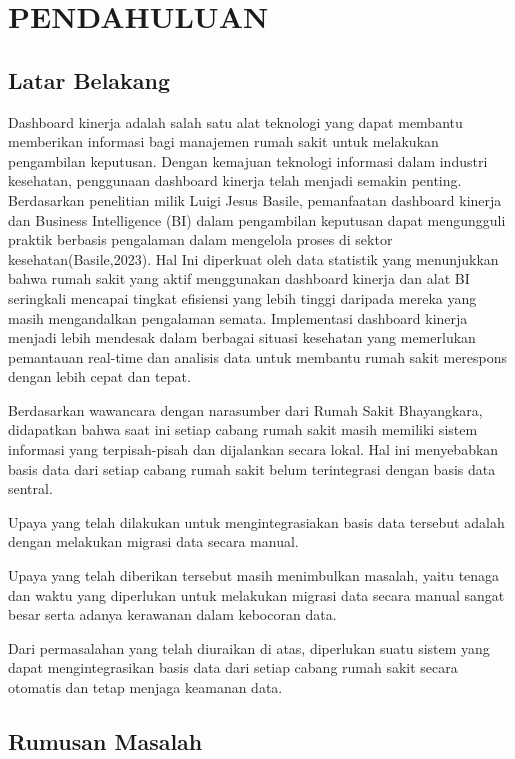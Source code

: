 \chapter{PENDAHULUAN}

\section{Latar Belakang}

Dashboard kinerja adalah salah satu alat teknologi yang dapat membantu memberikan informasi bagi manajemen rumah sakit untuk
melakukan pengambilan keputusan. Dengan kemajuan teknologi informasi dalam industri kesehatan, penggunaan dashboard kinerja telah menjadi semakin penting.
Berdasarkan penelitian milik Luigi Jesus Basile, pemanfaatan dashboard kinerja dan Business Intelligence (BI) dalam pengambilan keputusan dapat mengungguli praktik berbasis pengalaman 
dalam mengelola proses di sektor kesehatan(Basile,2023). Hal Ini diperkuat oleh data statistik yang menunjukkan bahwa rumah sakit yang aktif 
menggunakan dashboard kinerja dan alat BI seringkali mencapai tingkat efisiensi yang lebih tinggi daripada mereka yang masih 
mengandalkan pengalaman semata. Implementasi dashboard kinerja menjadi lebih mendesak dalam berbagai situasi kesehatan yang memerlukan pemantauan 
real-time dan analisis data untuk membantu rumah sakit merespons dengan lebih cepat dan tepat.

Berdasarkan wawancara dengan narasumber dari Rumah Sakit Bhayangkara, didapatkan bahwa saat ini setiap cabang rumah sakit masih memiliki 
sistem informasi yang terpisah-pisah dan dijalankan secara lokal. Hal ini menyebabkan basis data dari setiap cabang rumah sakit belum terintegrasi dengan basis data sentral. 


Upaya yang telah dilakukan untuk mengintegrasiakan basis data tersebut adalah dengan melakukan migrasi data secara manual.

Upaya yang telah diberikan tersebut masih menimbulkan masalah, yaitu tenaga dan waktu yang diperlukan untuk melakukan migrasi data secara manual sangat besar serta adanya kerawanan dalam kebocoran data.

Dari permasalahan yang telah diuraikan di atas, diperlukan suatu sistem yang dapat mengintegrasikan basis data dari setiap cabang rumah sakit secara otomatis dan tetap menjaga keamanan data.

\section{Rumusan Masalah}


